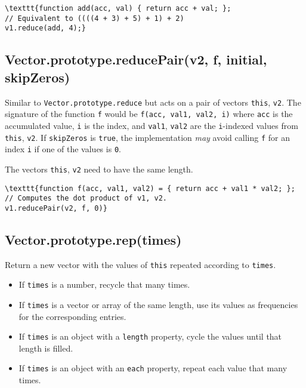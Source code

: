 \documentclass{article}
\begin{document}
\begin{lstlisting}
\texttt{function add(acc, val) { return acc + val; };
// Equivalent to ((((4 + 3) + 5) + 1) + 2)
v1.reduce(add, 4);}\end{lstlisting}

    \subsection*{Vector.prototype.reducePair(v2, f, initial, skipZeros)}
    Similar to \texttt{Vector.prototype.reduce} but acts on a pair of vectors \texttt{this}, \texttt{v2}.
The signature of the function \texttt{f} would be \texttt{f(acc, val1, val2, i)} where \texttt{acc}
is the accumulated value, \texttt{i} is the index, and \texttt{val1}, \texttt{val2} are the \texttt{i}-indexed
values from \texttt{this}, \texttt{v2}. If \texttt{skipZeros} is \texttt{true}, the implementation \emph{may} avoid
calling \texttt{f} for an index \texttt{i} if one of the values is \texttt{0}.


The vectors \texttt{this}, \texttt{v2} need to have the same length.


\begin{lstlisting}
\texttt{function f(acc, val1, val2) = { return acc + val1 * val2; };
// Computes the dot product of v1, v2.
v1.reducePair(v2, f, 0)}\end{lstlisting}

    \subsection*{Vector.prototype.rep(times)}
    Return a new vector with the values of \texttt{this} repeated according to \texttt{times}.


\begin{itemize}

\item If \texttt{times} is a number, recycle that many times.

\item If \texttt{times} is a vector or array of the same length, use its values as frequencies
for the corresponding entries.

\item If \texttt{times} is an object with a \texttt{length} property, cycle the values until that length
is filled.

\item If \texttt{times} is an object with an \texttt{each} property, repeat each value that many times.

\end{itemize}
\end{document}
